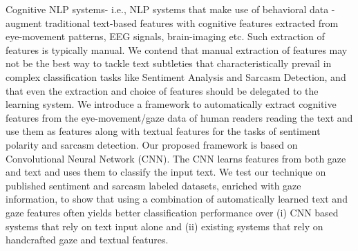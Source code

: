 Cognitive NLP systems- i.e., NLP systems that make use of behavioral data - augment traditional text-based features with cognitive features extracted from eye-movement patterns, EEG signals, brain-imaging etc. Such extraction of features is typically manual. We contend that manual extraction of features may not be the best way to tackle text subtleties that characteristically prevail in complex classification tasks like Sentiment Analysis and Sarcasm Detection, and that even the extraction and choice of features should be delegated to the learning system.  We introduce a framework to automatically extract cognitive features from the eye-movement/gaze data of human readers reading the text and use them as features along with textual features for the tasks of sentiment polarity and sarcasm detection. Our proposed framework is based on Convolutional Neural Network (CNN). The CNN learns features from both gaze and text and uses them to classify the input text. We test our technique on published sentiment and sarcasm labeled datasets, enriched with gaze information, to show that using a combination of automatically learned text and gaze features often yields better classification performance over (i)  CNN based systems that rely on text input alone and (ii) existing systems that rely on handcrafted gaze and textual features.
